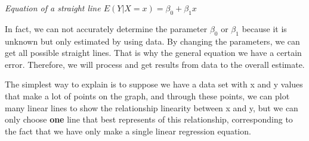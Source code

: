 \documentclass{article}
\begin{document}
    \begin{center}
        
        \textit{Equation of a straight line ${E(Y|X=x)=\beta _{0} + \beta _{1} x}$} 
    \end{center}
    
    In fact, we can not accurately determine the parameter $\beta_{0}$ or $\beta_{1}$ because it is unknown but only estimated by using data. By changing the parameters, we can get all possible straight lines. That is why the general equation we have a certain error. Therefore, we will process and get results from data to the overall estimate. 
	
    The simplest way to explain is to suppose we have a data set with x and y values that make a lot of points on the graph, and through these points, we can plot many linear lines to show the relationship linearity between x and y, but we can only choose \textbf{one} line that best represents of this relationship, corresponding to the fact that we have only make a single linear regression equation.
    
\end{document}
